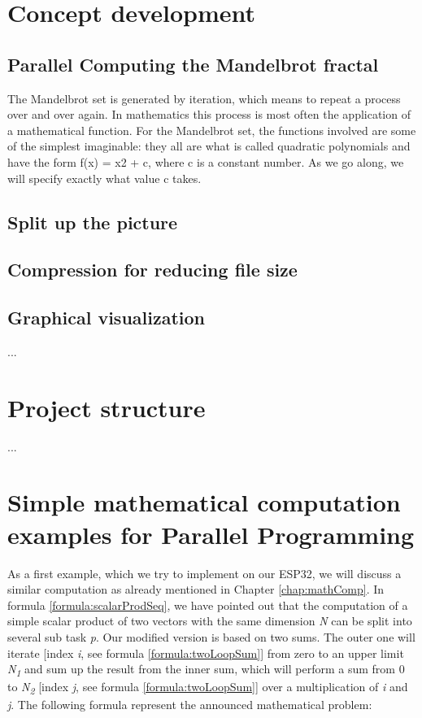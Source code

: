 \section{Concept development}


\subsection{Parallel Computing the Mandelbrot fractal}
The Mandelbrot set is generated by iteration, which means to repeat a process over and over again. In mathematics this process is most often the application of a mathematical function.
For the Mandelbrot set, the functions involved are some of the simplest imaginable: they all are what is called quadratic polynomials and have the form f(x) = x2 + c, where c is a constant number. As we go along, we will specify exactly what value c takes.

\subsection{Split up the picture}

\subsection{Compression for reducing file size}

\subsection{Graphical visualization}

...\newpage

\section{Project structure}

...\newpage

\section{Simple mathematical computation examples for Parallel Programming} \label{chap:simpleMathCompParallel}

As a first example, which we try to implement on our ESP32, we will discuss a similar computation as already mentioned in Chapter \ref{chap:mathComp}. In formula \ref{formula:scalarProdSeq}, we have pointed out that the computation of a simple scalar product of two vectors with the same dimension \textit{N} can be split into several sub task \textit{p}. Our modified version is based on two sums. The outer one will iterate [index \textit{i}, see formula \ref{formula:twoLoopSum}] from zero to an upper limit \textit{N\textsubscript{1}} and sum up the result from the inner sum, which will perform a sum from 0 to \textit{N\textsubscript{2}} [index \textit{j}, see formula \ref{formula:twoLoopSum}] over a multiplication of \textit{i} and \textit{j}. The following formula represent the announced mathematical problem:

